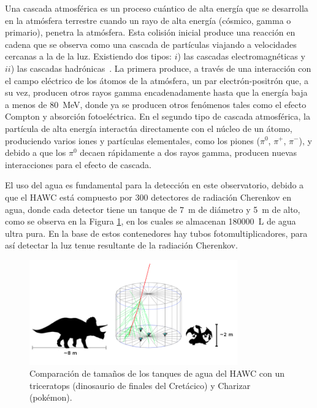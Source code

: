Una cascada atmosférica es un proceso cuántico de alta energía que se
desarrolla en la atmósfera terrestre cuando un rayo de alta energía (cósmico,
gamma o primario), penetra la atmósfera. Esta colisión inicial produce una
reacción en cadena que se observa como una cascada de partículas viajando a
velocidades cercanas a la de la luz. Existiendo dos tipos: $i$) las cascadas
electromagnéticas y $ii$) las cascadas hadrónicas~\cite{rao1998extensive}. La
primera produce, a través de una interacción con el campo eléctrico de los
átomos de la atmósfera, un par electrón-positrón que, a su vez, producen otros
rayos gamma encadenadamente hasta que la energía baja a menos de
\SI{80}{\mega\electronvolt}, donde ya se producen otros fenómenos tales como el
efecto Compton y absorción fotoeléctrica.  En el segundo tipo de cascada
atmosférica, la partícula de alta energía interactúa directamente con el núcleo
de un átomo, produciendo varios iones y partículas elementales, como los piones
($\pi^0$, $\pi^+$, $\pi^-$), y debido a que los $\pi^0$ decaen rápidamente a
dos rayos gamma, producen nuevas interacciones para el efecto de cascada.

El uso del agua es fundamental para la detección en este observatorio, debido a
que el HAWC está compuesto por \num{300} detectores de radiación Cherenkov en
agua, donde cada detector tiene un tanque de \SI{7}{\meter} de diámetro y
\SI{5}{\meter} de alto, como se observa en la Figura \ref{dino_cherenkov}, en
los cuales se almacenan \SI{180000}{\liter} de agua ultra pura.  En la base de
estos contenedores hay tubos fotomultiplicadores, para así detectar la luz
tenue resultante de la radiación Cherenkov.

\begin{figure}
    \centering
    \includegraphics[width=0.80\textwidth]{2/img/dino_cherenkov}
    \caption{Comparación de tamaños de los tanques de agua del HAWC con un triceratops
(dinosaurio de finales del Cretácico) y Charizar (pokémon).}
\label{dino_cherenkov}
\end{figure}

